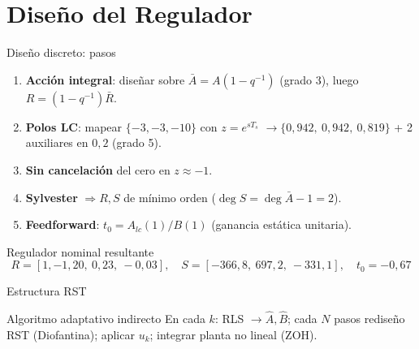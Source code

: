\documentclass{beamer}
\begin{document}
\section{Diseño del Regulador}

\begin{frame}{Diseño discreto: pasos}
\begin{enumerate}
  \item \textbf{Acción integral}: diseñar sobre $\bar A = A(1-q^{-1})$ (grado 3),
  luego $R = (1-q^{-1})\bar R$.
  \item \textbf{Polos LC}: mapear $\{-3,-3,-10\}$ con $z=e^{sT_s}$
  $\rightarrow \{0{,}942,\ 0{,}942,\ 0{,}819\}$ + 2 auxiliares en $0{,}2$
  (grado 5).
  \item \textbf{Sin cancelación} del cero en $z\approx-1$.
  \item \textbf{Sylvester} $\Rightarrow R,S$ de mínimo orden
  ($\deg S = \deg \bar A - 1 = 2$).
  \item \textbf{Feedforward}: $t_0 = A_{lc}(1)/B(1)$ (ganancia estática unitaria).
\end{enumerate}
\begin{block}{Regulador nominal resultante}
\[
R = [1, -1{,}20,\ 0{,}23,\ -0{,}03], \quad
S = [-366{,}8,\ 697{,}2,\ -331{,}1], \quad t_0 = -0{,}67
\]
\end{block}
\end{frame}

\begin{frame}{Estructura RST}
\begin{figure}
\centering
{}
\end{figure}
\begin{block}{Algoritmo adaptativo indirecto}
En cada $k$: RLS $\rightarrow \hat A,\hat B$; cada $N$ pasos rediseño RST
(Diofantina); aplicar $u_k$; integrar planta no lineal (ZOH).
\end{block}
\end{frame}
\end{document}
